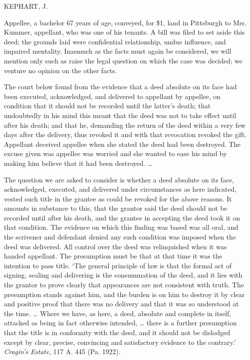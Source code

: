
KEPHART, J.

Appellee, a bachelor 67 years of age, conveyed, for \$1, land in Pittsburgh to
Mrs. Kummer, appellant, who was one of his tenants. A bill was filed to set
aside this deed; the grounds laid were confidential relationship, undue
influence, and impaired mentality. Inasmuch as the facts must again be
considered, we will mention only such as raise the legal question on which the
case was decided; we venture no opinion on the other facts.

The court below found from the evidence that a deed absolute on its face had
been executed, acknowledged, and delivered to appellant by appellee, on
condition that it should not be recorded until the latter's death; that
undoubtedly in his mind this meant that the deed was not to take effect until
after his death; and that he, demanding the return of the deed within a very
few days after the delivery, thus revoked it and with that revocation revoked
the gift. Appellant deceived appellee when she stated the deed had been
destroyed. The excuse given was appellee was worried and she wanted to ease his
mind by making him believe that it had been destroyed. \dots{}

The question we are asked to consider is whether a deed absolute on its face,
acknowledged, executed, and delivered under circumstances as here indicated,
vested such title in the grantee as could be revoked for the above reasons. It
amounts in substance to this, that the grantor said the deed should not be
recorded until after his death, and the grantee in accepting the deed took it
on that condition. The evidence on which this finding was based was all oral,
and the scrivener and defendant denied any such condition was imposed when the
deed was delivered. All control over the deed was relinquished when it was
handed appellant. The presumption must be that at that time it was the
intention to pass title. `The general principle of law is that the formal act
of signing, sealing and delivering is the consummation of the deed, and it lies
with the grantor to prove clearly that appearances are not consistent with
truth. The presumption stands against him, and the burden is on him to destroy
it by clear and positive proof that there was no delivery and that it was so
understood at the time. \dots{} Where we have, as here, a deed, absolute and
complete in itself, attacked as being in fact otherwise intended, \dots{} there
is a further presumption that the title is in conformity with the deed, and it
should not be dislodged except by clear, precise, convincing and satisfactory
evidence to the contrary.' \textit{Cragin's Estate}, 117 A. 445 (Pa. 1922).

